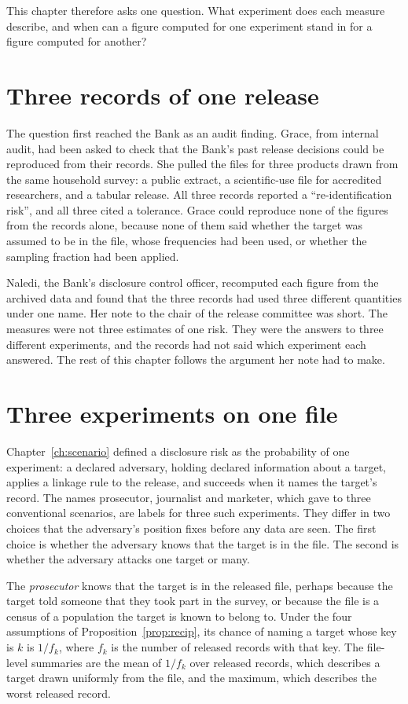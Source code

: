 This chapter therefore asks one question. What experiment does each measure describe,
and when can a figure computed for one experiment stand in for a figure computed for
another?

\section{Three records of one release}

The question first reached the Bank as an audit finding. Grace, from internal audit,
had been asked to check that the Bank's past release decisions could be reproduced from
their records. She pulled the files for three products drawn from the same household
survey: a public extract, a scientific-use file for accredited researchers, and a
tabular release. All three records reported a ``re-identification risk'', and all three
cited a tolerance. Grace could reproduce none of the figures from the records alone,
because none of them said whether the target was assumed to be in the file, whose
frequencies had been used, or whether the sampling fraction had been applied.

Naledi, the Bank's disclosure control officer, recomputed each figure from the archived
data and found that the three records had used three different quantities under one
name. Her note to the chair of the release committee was short. The measures were not
three estimates of one risk. They were the answers to three different experiments, and
the records had not said which experiment each answered. The rest of this chapter
follows the argument her note had to make.

\section{Three experiments on one file}

Chapter~\ref{ch:scenario} defined a disclosure risk as the probability of one
experiment: a declared adversary, holding declared information about a target, applies
a linkage rule to the release, and succeeds when it names the target's record. The
names prosecutor, journalist and marketer, which \citet{elemam2008} gave to three
conventional scenarios, are labels for three such experiments. They differ in two
choices that the adversary's position fixes before any data are seen. The first choice
is whether the adversary knows that the target is in the file. The second is whether the
adversary attacks one target or many.

The \emph{prosecutor} knows that the target is in the released file, perhaps because the
target told someone that they took part in the survey, or because the file is a census
of a population the target is known to belong to. Under the four assumptions of
Proposition~\ref{prop:recip}, its chance of naming a target whose key is $k$ is
$1/f_k$, where $f_k$ is the number of released records with that key. The file-level
summaries are the mean of $1/f_k$ over released records, which describes a target drawn
uniformly from the file, and the maximum, which describes the worst released record.

